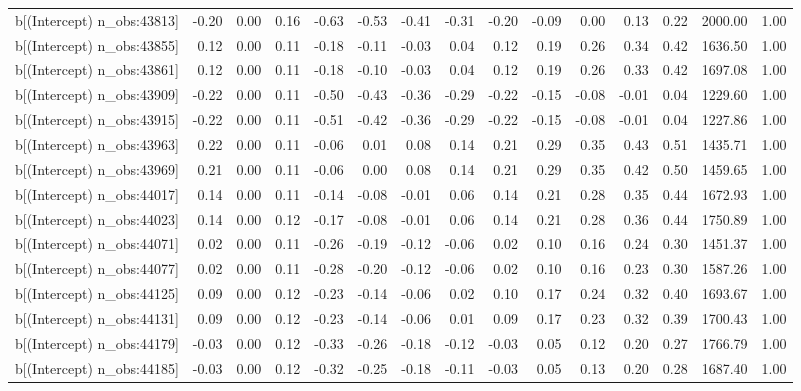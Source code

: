 \begin{table}[ht]
\begin{tabular}{rrrrrrrrrrrrrrr}
  b[(Intercept) n\_obs:43813] & -0.20 & 0.00 & 0.16 & -0.63 & -0.53 & -0.41 & -0.31 & -0.20 & -0.09 & 0.00 & 0.13 & 0.22 & 2000.00 & 1.00 \\ 
  b[(Intercept) n\_obs:43855] & 0.12 & 0.00 & 0.11 & -0.18 & -0.11 & -0.03 & 0.04 & 0.12 & 0.19 & 0.26 & 0.34 & 0.42 & 1636.50 & 1.00 \\ 
  b[(Intercept) n\_obs:43861] & 0.12 & 0.00 & 0.11 & -0.18 & -0.10 & -0.03 & 0.04 & 0.12 & 0.19 & 0.26 & 0.33 & 0.42 & 1697.08 & 1.00 \\ 
  b[(Intercept) n\_obs:43909] & -0.22 & 0.00 & 0.11 & -0.50 & -0.43 & -0.36 & -0.29 & -0.22 & -0.15 & -0.08 & -0.01 & 0.04 & 1229.60 & 1.00 \\ 
  b[(Intercept) n\_obs:43915] & -0.22 & 0.00 & 0.11 & -0.51 & -0.42 & -0.36 & -0.29 & -0.22 & -0.15 & -0.08 & -0.01 & 0.04 & 1227.86 & 1.00 \\ 
  b[(Intercept) n\_obs:43963] & 0.22 & 0.00 & 0.11 & -0.06 & 0.01 & 0.08 & 0.14 & 0.21 & 0.29 & 0.35 & 0.43 & 0.51 & 1435.71 & 1.00 \\ 
  b[(Intercept) n\_obs:43969] & 0.21 & 0.00 & 0.11 & -0.06 & 0.00 & 0.08 & 0.14 & 0.21 & 0.29 & 0.35 & 0.42 & 0.50 & 1459.65 & 1.00 \\ 
  b[(Intercept) n\_obs:44017] & 0.14 & 0.00 & 0.11 & -0.14 & -0.08 & -0.01 & 0.06 & 0.14 & 0.21 & 0.28 & 0.35 & 0.44 & 1672.93 & 1.00 \\ 
  b[(Intercept) n\_obs:44023] & 0.14 & 0.00 & 0.12 & -0.17 & -0.08 & -0.01 & 0.06 & 0.14 & 0.21 & 0.28 & 0.36 & 0.44 & 1750.89 & 1.00 \\ 
  b[(Intercept) n\_obs:44071] & 0.02 & 0.00 & 0.11 & -0.26 & -0.19 & -0.12 & -0.06 & 0.02 & 0.10 & 0.16 & 0.24 & 0.30 & 1451.37 & 1.00 \\ 
  b[(Intercept) n\_obs:44077] & 0.02 & 0.00 & 0.11 & -0.28 & -0.20 & -0.12 & -0.06 & 0.02 & 0.10 & 0.16 & 0.23 & 0.30 & 1587.26 & 1.00 \\ 
  b[(Intercept) n\_obs:44125] & 0.09 & 0.00 & 0.12 & -0.23 & -0.14 & -0.06 & 0.02 & 0.10 & 0.17 & 0.24 & 0.32 & 0.40 & 1693.67 & 1.00 \\ 
  b[(Intercept) n\_obs:44131] & 0.09 & 0.00 & 0.12 & -0.23 & -0.14 & -0.06 & 0.01 & 0.09 & 0.17 & 0.23 & 0.32 & 0.39 & 1700.43 & 1.00 \\ 
  b[(Intercept) n\_obs:44179] & -0.03 & 0.00 & 0.12 & -0.33 & -0.26 & -0.18 & -0.12 & -0.03 & 0.05 & 0.12 & 0.20 & 0.27 & 1766.79 & 1.00 \\ 
  b[(Intercept) n\_obs:44185] & -0.03 & 0.00 & 0.12 & -0.32 & -0.25 & -0.18 & -0.11 & -0.03 & 0.05 & 0.13 & 0.20 & 0.28 & 1687.40 & 1.00 \\ 

\end{tabular}
\end{table}
